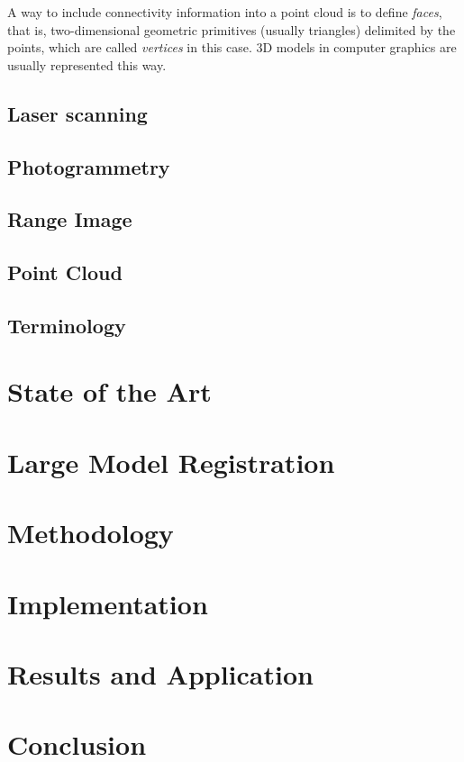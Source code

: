 \documentclass[a4paper,10pt]{scrreprt}
\begin{document}
A way to include connectivity information into a point cloud is to define \emph{faces}, that is, two-dimensional geometric primitives (usually triangles) delimited by the points, which are called \emph{vertices} in this case. 3D models in computer graphics are usually represented this way.


 



\section{Laser scanning}

\section{Photogrammetry}

\section{Range Image}

\section{Point Cloud}

\section{Terminology}

\chapter{State of the Art}

\chapter{Large Model Registration}

\chapter{Methodology}

\chapter{Implementation}

\chapter{Results and Application}

\chapter{Conclusion}


\nocite{*}

\end{document}
